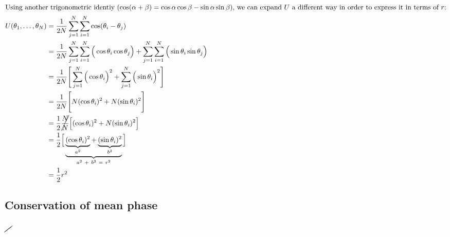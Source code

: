 \documentclass[11pt,a4paper]{article}
\begin{document}
 
\begin{align*}
\intertext{Using another trigonometric identiy ($\cos(\alpha + \beta) = \cos\alpha\cos\beta - \sin\alpha\sin\beta$), we can expand $U$ a different way in order to express it in terms of $r$:}
    U(\theta_1, \ldots, \theta_N) 	& = \frac{1}{2N} \sum_{j=1}^{N}\sum_{i=1}^{N} \cos(\theta_i - \theta_j) \\
    								& = \frac{1}{2N} \sum_{j=1}^{N}\sum_{i=1}^{N} \Big( \cos\theta_i\cos\theta_j \Big) + \sum_{j=1}^{N}\sum_{i=1}^{N} \Big( \sin\theta_i\sin\theta_j\Big) \\
    								& = \frac{1}{2N} \Bigg[ \sum_{j=1}^{N}  \Big( \cos\theta_i \Big)^2 + \sum_{j=1}^{N} \Big( \sin\theta_i\Big)^2 \Bigg] \\
    								& = \frac{1}{2N} \Bigg[ N (\cos\theta_i)^2 +  N  (\sin\theta_i)^2 \Bigg] \\
    								& = \frac{1}{2}\cancel{\frac{N}{N}} \Big[  (\cos\theta_i)^2 +  N (\sin\theta_i)^2 \Big] \\
    								& = \frac{1}{2} \Big[ \underbrace{\underbrace{(\cos\theta_i)^2}_{a^2} +  \underbrace{(\sin\theta_i)^2}_{b^2}}_{ a^2 \  + \ b^2 \ = \ r^2} \Big] \\
    								& = \frac{1}{2} r^2 
\end{align*}    









\subsection{Conservation of mean phase}

$ \cancel{\quad}$





















\clearpage
\end{document}
